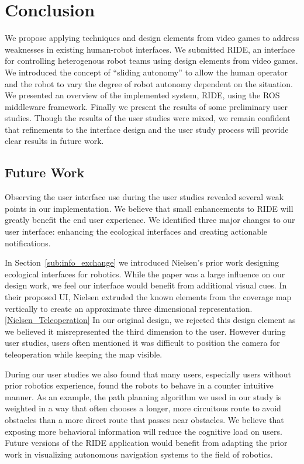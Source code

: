 \chapter{Conclusion}

We propose applying techniques and design elements from video games to address weaknesses in existing human-robot interfaces. We submitted RIDE, an interface for controlling heterogenous robot teams using design elements from video games. We introduced the concept of ``sliding autonomy'' to allow the human operator and the robot to vary the degree of robot autonomy dependent on the situation. We presented an overview of the implemented system, RIDE, using the ROS middleware framework. Finally we present the results of some preliminary user studies. Though the results of the user studies were mixed, we remain confident that refinements to the interface design and the user study process will provide clear results in future work.

\section{Future Work}
\label{section:futurework}
Observing the user interface use during the user studies revealed several weak points in our implementation. We believe that small enhancements to RIDE will greatly benefit the end user experience. %
We identified three major changes to our user interface: enhancing the ecological interfaces and creating actionable notifications.

In Section~\ref{sub:info_exchange} we introduced Nielsen's prior work designing ecological interfaces for robotics. While the paper was a large influence on our design work, we feel our interface would benefit from additional visual cues. In their proposed UI, Nielsen extruded the known elements from the coverage map vertically to create an approximate three dimensional representation. \ref{Nielsen_Teleoperation} In our original design, we rejected this design element as we believed it misrepresented the third dimension to the user. However during user studies, users often mentioned it was difficult to position the camera for teleoperation while keeping the map visible.

During our user studies we also found that many users, especially users without prior robotics experience, found the robots to behave in a counter intuitive manner. As an example, the path planning algorithm we used in our study is weighted in a way that often chooses a longer, more circuitous route to avoid obstacles than a more direct route that passes near obstacles. We believe that exposing more behavioral information will reduce the cognitive load on users. Future versions of the RIDE application would benefit from adapting the prior work in visualizing autonomous navigation systems to the field of robotics.


